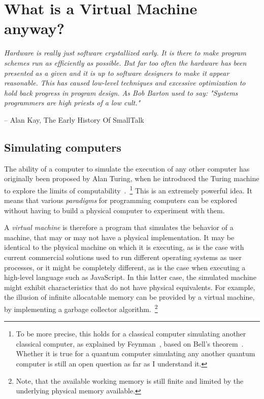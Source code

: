 \chapter{What is a Virtual Machine anyway?}
\emph{Hardware is really just software crystallized early. It is there to make
program schemes run as efficiently as possible. But far too often the hardware
has been presented as a given and it is up to software designers to make it
appear reasonable. This has caused low-level techniques and excessive
optimization to hold back progress in program design. As Bob Barton used to
say: "Systems programmers are high priests of a low cult."}

-- Alan Kay, The Early History Of SmallTalk \cite{Kay:1993}

\section{Simulating computers}

The ability of a computer to simulate the execution of any other computer has
originally been proposed by Alan Turing, when he introduced the Turing machine
to explore the limits of computability~\cite{Turing1936}.~\footnote{To be more
precise, this holds for a classical computer simulating another classical
computer, as explained by Feynman~\cite{Feynman1982}, based on Bell's
theorem~\cite{Bell1964a}. Whether it is true for a quantum computer simulating
any another quantum computer is still an open question as far as I understand
it.} This is an extremely powerful idea. It means that various
\textit{paradigms} for programming computers can be explored without having to
build a physical computer to experiment with them. 

A \textit{virtual machine} is therefore a program that simulates the behavior of a
machine, that may or may not have a physical implementation. It may be
identical to the physical machine on which it is executing, as is the case with
current commercial solutions used to run different operating systems as user
processes, or it might be completely different, as is the case when executing a
high-level language such as JavaScript. In this latter case, the simulated
machine might exhibit characteristics that do not have physical equivalents.
For example, the illusion of infinite allocatable memory can be provided by a
virtual machine, by implementing a garbage collector algorithm.~\footnote{Note,
that the available working memory is still finite and limited by the underlying
physical memory available.} 

